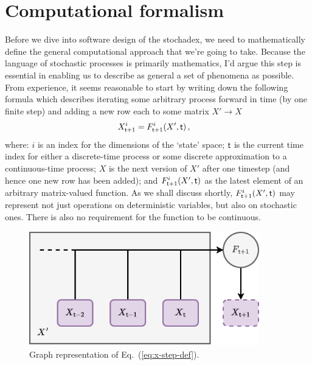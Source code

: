 \documentclass{book}
\begin{document}
\section{\sffamily Computational formalism}

Before we dive into software design of the stochadex, we need to mathematically define the general computational approach that we're going to take. Because the language of stochastic processes is primarily mathematics, I'd argue this step is essential in enabling us to describe as general a set of phenomena as possible. From experience, it seems reasonable to start by writing down the following formula which describes iterating some arbitrary process forward in time (by one finite step) and adding a new row each to some matrix $X' \rightarrow X$
\begin{align}
X^{i}_{{\sf t}+1} &= F^{i}_{{\sf t}+1}(X',{\sf t}) \,, \label{eq:x-step-def}
\end{align}
where: $i$ is an index for the dimensions of the `state' space; ${\sf t}$ is the current time index for either a discrete-time process or some discrete approximation to a continuous-time process; $X$ is the next version of $X'$ after one timestep (and hence one new row has been added); and $F^i_{{\sf t}+1}(X',{\sf t})$ as the latest element of an arbitrary matrix-valued function. As we shall discuss shortly, $F^i_{{\sf t}+1}(X',{\sf t})$ may represent not just operations on deterministic variables, but also on stochastic ones. There is also no requirement for the function to be continuous.

\begin{figure}[h]
\centering
\includegraphics[width=10cm]{images/fundamental-loop.drawio.png}
\caption{Graph representation of Eq.~(\ref{eq:x-step-def}).}
\label{fig:fundamental-loop}
\end{figure}
\end{document}
